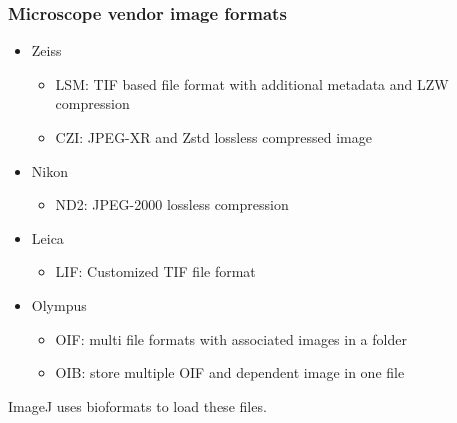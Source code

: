 \documentclass[ignorenonframetext,aspectratio=169,10pt,xcolor=table]{beamer}
\begin{document}
\begin{frame} \frametitle{Microscope vendor image formats}

  \begin{itemize}
  \item Zeiss
    \begin{itemize}
    \item LSM: TIF based file format with additional metadata and LZW
      compression
    \item CZI: JPEG-XR and Zstd lossless compressed image
    \end{itemize}
  \item Nikon
    \begin{itemize}
    \item ND2: JPEG-2000 lossless compression
    \end{itemize}
  \item Leica
    \begin{itemize}
    \item LIF: Customized TIF file format
    \end{itemize}
  \item Olympus
    \begin{itemize}
    \item OIF: multi file formats with associated images in a folder
    \item OIB: store multiple OIF and dependent image in one file
    \end{itemize}
  \end{itemize}


  ImageJ uses bioformats to load these files.

\end{frame}
\end{document}
